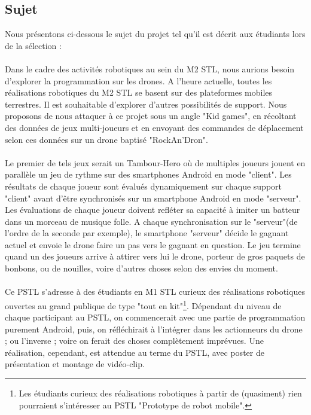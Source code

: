 \subsection{Sujet}
Nous présentons ci-dessous le sujet du projet tel qu'il est décrit aux étudiants lors de la sélection :

\paragraph{}
Dans le cadre des activités robotiques au sein du M2 STL, nous aurions besoin d’explorer la programmation sur les drones. A l’heure actuelle, toutes les réalisations robotiques du M2 STL se basent sur des plateformes mobiles terrestres. Il est souhaitable d’explorer d’autres possibilités de support. Nous proposons de nous attaquer à ce projet sous un angle "Kid games", en récoltant des données de jeux multi-joueurs et en envoyant des commandes de déplacement selon ces données sur un drone baptisé "RockAn’Dron".

\paragraph{}
Le premier de tels jeux serait un Tambour-Hero où de multiples joueurs jouent en parallèle un jeu de rythme sur des smartphones Android en mode "client". Les résultats de chaque joueur sont évalués dynamiquement sur chaque support "client" avant d’être synchronisés sur un smartphone Android en mode "serveur". Les évaluations de chaque joueur doivent refléter sa capacité à imiter un batteur dans un morceau de musique folle. A chaque synchronisation sur le "serveur"(de l’ordre de la seconde par exemple), le smartphone "serveur" décide le gagnant actuel et envoie le drone faire un pas vers le gagnant en question. Le jeu termine quand un des joueurs arrive à attirer vers lui le drone, porteur de gros paquets de bonbons, ou de nouilles, voire d’autres choses selon des envies du moment.

\paragraph{}
Ce PSTL s’adresse à des étudiants en M1 STL curieux des réalisations robotiques ouvertes au grand publique de type "tout en kit"\footnote{Les étudiants curieux des réalisations robotiques à partir de (quasiment) rien pourraient s’intéresser au PSTL "Prototype de robot mobile".}. Dépendant du niveau de chaque participant au PSTL, on commencerait avec une partie de programmation purement Android, puis, on réfléchirait à l’intégrer dans les actionneurs du drone ; ou l’inverse ; voire on ferait des choses complètement imprévues. Une réalisation, cependant, est attendue au terme du PSTL, avec poster de présentation et montage de vidéo-clip.